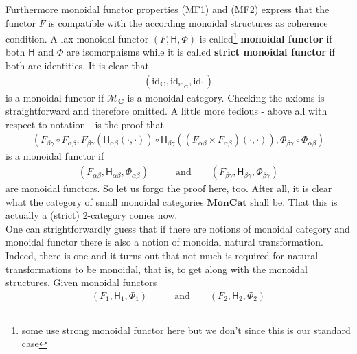 Furthermore monoidal functor properties (MF1) and (MF2) express that the functor $F$ is compatible with the according monoidal structures as coherence condition. A lax monoidal functor $(F,\mathsf{H},\Phi)$ is called\footnote{some use strong monoidal functor here but we don't since this is our standard case} \textbf{monoidal functor} if both $\mathsf{H}$ and $\Phi$ are isomorphisms while it is called \textbf{strict monoidal functor} if both are identities. It is clear that
\begin{align*}
  \left(
    \mathrm{id}_{\mathbf{C}},
    \mathrm{id}_{\mathrm{id}_{\mathbf{C}}},
    \mathrm{id}_{1}
  \right)
\end{align*}
is a monoidal functor if $\mathcal{M}_{\mathbf{C}}$ is a monoidal category. Checking the axioms is straightforward and therefore omitted. A little more tedious - above all with respect to notation - is the proof that
\begin{align*}
  \left(
    F_{\beta\gamma}
    \circ
    F_{\alpha\beta},
    F_{\beta\gamma}
    \left(
      \mathsf{H}_{\alpha\beta}(\cdot,\cdot)
    \right)
    \circ
    \mathsf{H}_{\beta\gamma}
    \left(
      \left(
        F_{\alpha\beta}
        \times
        F_{\alpha\beta}
      \right)
      (\cdot,\cdot)
    \right),
    \Phi_{\beta\gamma}
    \circ
    \Phi_{\alpha\beta}
  \right)
\end{align*}
is a monoidal functor if
\begin{align*}
  \left(
    F_{\alpha\beta},
    \mathsf{H}_{\alpha\beta},
    \Phi_{\alpha\beta}
  \right)
  \qquad
  &\text{and}
  \qquad
  \left(
    F_{\beta\gamma},
    \mathsf{H}_{\beta\gamma},
    \Phi_{\beta\gamma}
  \right)
\end{align*}
are monoidal functors. So let us forgo the proof here, too. After all, it is clear what the category of small monoidal categories $\mathbf{MonCat}$ shall be. That this is actually a (strict) $2$-category comes now.
\\
One can strightforwardly guess that if there are notions of monoidal category and monoidal functor there is also a notion of monoidal natural transformation. Indeed, there is one and it turns out that not much is required for natural transformations to be monoidal, that is, to get along with the monoidal structures. Given monoidal functors
\begin{align*}
  \left(
    F_{1},
    \mathsf{H}_{1},
    \Phi_{1}
  \right)
  \qquad
  &\text{and}
  \qquad
  \left(
    F_{2},
    \mathsf{H}_{2},
    \Phi_{2}
  \right)
\end{align*}
